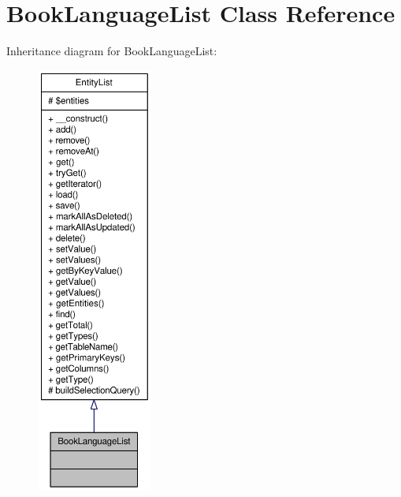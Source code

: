 \hypertarget{classBookLanguageList}{
\section{BookLanguageList Class Reference}
\label{classBookLanguageList}
}


Inheritance diagram for BookLanguageList:\nopagebreak
\begin{figure}[H]
\begin{center}
\leavevmode
\includegraphics[height=400pt]{classBookLanguageList__inherit__graph}
\end{center}
\end{figure}


